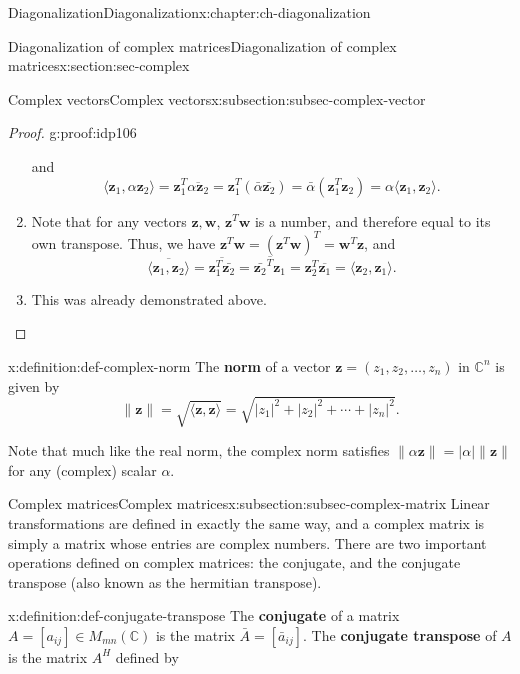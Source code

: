 \documentclass[oneside,10pt,]{book}
\newcommand{\terminology}[1]{\textbf{#1}}
\numberwithin{equation}{section}
\newcommand{\C}{\mathbb{C}}
\newcommand{\len}[1]{\lVert #1\rVert}
\newcommand{\abs}[1]{\lvert #1\rvert}
\newcommand{\zz}{\mathbf{z}}
\newcommand{\ww}{\mathbf{w}}
\begin{document}
\begin{chapterptx}{Diagonalization}{}{Diagonalization}{}{}{x:chapter:ch-diagonalization}
\begin{sectionptx}{Diagonalization of complex matrices}{}{Diagonalization of complex matrices}{}{}{x:section:sec-complex}
\begin{subsectionptx}{Complex vectors}{}{Complex vectors}{}{}{x:subsection:subsec-complex-vector}
\begin{proof}{}{g:proof:idp106}
\begin{enumerate}
\begin{equation*}
\end{equation*}
and%
\begin{equation*}
\langle \zz_1,\alpha\zz_2\rangle = \zz_1^T\overline{\alpha \zz_2} = \zz_1^T(\bar{\alpha}\bar{\zz_2}) = \bar{\alpha}(\zz_1^T\zz_2)=\alpha\langle \zz_1,\zz_2\rangle\text{.}
\end{equation*}
%
\item{}Note that for any vectors \(\zz,\ww\), \(\zz^T\ww\) is a number, and therefore equal to its own transpose. Thus, we have \(\zz^T\ww = (\zz^T\ww)^T=\ww^T\zz\), and%
\begin{equation*}
\overline{\langle \zz_1,\zz_2\rangle} = \overline{\zz_1^T\bar{\zz_2}} = \overline{\bar{\zz_2}^T\zz_1} = \zz_2^T\overline{\zz_1}=\langle \zz_2,\zz_1\rangle\text{.}
\end{equation*}
%
\item{}This was already demonstrated above.%
\end{enumerate}
%
\end{proof}
\begin{definition}{}{x:definition:def-complex-norm}%
The \terminology{norm} of a vector \(\zz = (z_1,z_2,\ldots, z_n)\) in \(\C^n\) is given by%
\begin{equation*}
\len{\zz} = \sqrt{\langle \zz,\zz\rangle} = \sqrt{\abs{z_1}^2+\abs{z_2}^2+\cdots +\abs{z_n}^2}\text{.}
\end{equation*}
%
\end{definition}
Note that much like the real norm, the complex norm satisfies \(\len{\alpha\zz}=\abs{\alpha}\len{\zz}\) for any (complex) scalar \(\alpha\).%
\end{subsectionptx}
%
%
\typeout{************************************************}
\typeout{************************************************}
%
\begin{subsectionptx}{Complex matrices}{}{Complex matrices}{}{}{x:subsection:subsec-complex-matrix}
Linear transformations are defined in exactly the same way, and a complex matrix is simply a matrix whose entries are complex numbers. There are two important operations defined on complex matrices: the conjugate, and the conjugate transpose (also known as the hermitian transpose).%
\begin{definition}{}{x:definition:def-conjugate-transpose}%
The \terminology{conjugate} of a matrix \(A=[a_{ij}]\in M_{mn}(\C)\) is the matrix \(\bar{A}=[\bar{a}_{ij}]\). The \terminology{conjugate transpose} of \(A\) is the matrix \(A^H\) defined by%
\begin{equation*}

\end{equation*}
\end{definition}
\end{subsectionptx}
\end{sectionptx}
\end{chapterptx}
\end{document}

